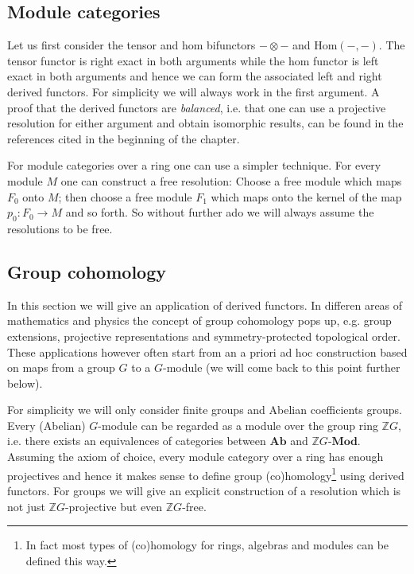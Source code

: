 \subsection{Module categories}

	Let us first consider the tensor and hom bifunctors $-\otimes-$ and Hom$(-, -)$. The tensor functor is right exact in both arguments while the hom functor is left exact in both arguments and hence we can form the associated left and right derived functors. For simplicity we will always work in the first argument. A proof that the derived functors are \textit{balanced}, i.e. that one can use a projective resolution for either argument and obtain isomorphic results, can be found in the references cited in the beginning of the chapter.
	
	
	
	For module categories over a ring one can use a simpler technique. For every module $M$ one can construct a free resolution: Choose a free module which maps $F_0$ onto $M$; then choose a free module $F_1$ which maps onto the kernel of the map $p_0:F_0\rightarrow M$ and so forth. So without further ado we will always assume the resolutions to be free.

\subsection{Group cohomology}

	In this section we will give an application of derived functors. In differen areas of mathematics and physics the concept of group cohomology pops up, e.g. group extensions, projective representations and symmetry-protected topological order. These applications however often start from an a priori ad hoc construction based on maps from a group $G$ to a $G$-module (we will come back to this point further below).
	
	For simplicity we will only consider finite groups and Abelian coefficients groups. Every (Abelian) $G$-module can be regarded as a module over the group ring $\mathbb{Z}G$, i.e. there exists an equivalences of categories between $\mathbf{Ab}$ and $\mathbb{Z}G$-$\mathbf{Mod}$. Assuming the axiom of choice, every module category over a ring has enough projectives and hence it makes sense to define group (co)homology\footnote{In fact most types of (co)homology for rings, algebras and modules can be defined this way.} using derived functors. For groups we will give an explicit construction of a resolution which is not just $\mathbb{Z}G$-projective but even $\mathbb{Z}G$-free.
	
